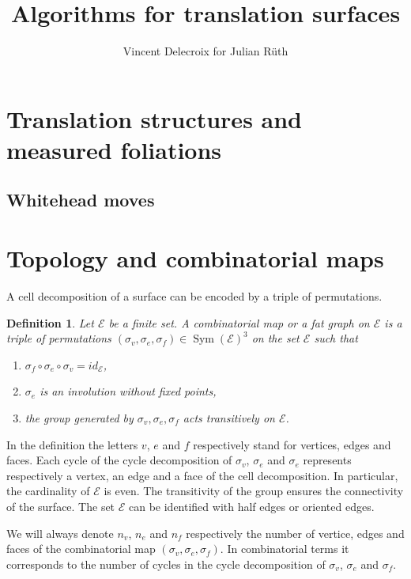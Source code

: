 \documentclass{article}
\title{Algorithms for translation surfaces}
\author{Vincent Delecroix for Julian R\"uth}
\def\cE{\mathcal{E}}
\def\Sym{\operatorname{Sym}}
\newtheorem{definition}{Definition}
\begin{document}
\maketitle

\section{Translation structures and measured foliations}

\subsection{Whitehead moves}

\section{Topology and combinatorial maps}
\label{sec:TriangulationsAndTranslationStructures}

A cell decomposition of a surface can be encoded by a triple of
permutations.
\begin{definition}
Let $\cE$ be a finite set.
A \emph{combinatorial map} or a \emph{fat graph} on $\cE$ is a triple
of permutations $(\sigma_v, \sigma_e, \sigma_f) \in \Sym(\cE)^3$ on
the set $\cE$ such that
\begin{enumerate}
\item $\sigma_f \circ \sigma_e \circ \sigma_v = id_\cE$,
\item $\sigma_e$ is an involution without fixed points,
\item the group generated by $\sigma_v, \sigma_e, \sigma_f$ acts transitively on $\cE$.
\end{enumerate}
\end{definition}
In the definition the letters  $v$, $e$ and $f$ respectively stand for vertices, edges
and faces.  Each cycle of the cycle decomposition of $\sigma_v$, $\sigma_e$
and $\sigma_e$ represents respectively a vertex, an edge
and a face of the cell decomposition. In particular, the cardinality of $\cE$
is even. The transitivity of the group ensures the connectivity of the surface.
The set $\cE$ can be identified with half edges or oriented edges.

We will always denote $n_v$, $n_e$ and $n_f$ respectively the number of vertice,
edges and faces of the combinatorial map $(\sigma_v, \sigma_e, \sigma_f)$. In
combinatorial terms it corresponds to the number of cycles in the cycle decomposition
of $\sigma_v$, $\sigma_e$ and $\sigma_f$.
\end{document}
